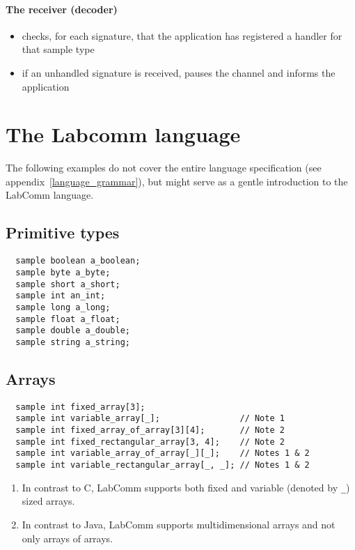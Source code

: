\documentclass[a4paper]{article}
\begin{document}
\paragraph{The receiver (decoder)}

\begin{itemize}
 \item checks, for each signature, that the application has registered a handler for that sample type
 \item if an unhandled signature is received, pauses the channel and informs the application
\end{itemize}

\section{The Labcomm language}

The following examples do not cover the entire language
specification (see appendix~\ref{language_grammar}), but might serve as a
gentle introduction to the LabComm language.

\subsection{Primitive types}

\begin{verbatim}
  sample boolean a_boolean;
  sample byte a_byte;
  sample short a_short;
  sample int an_int;
  sample long a_long;
  sample float a_float;
  sample double a_double;
  sample string a_string;
\end{verbatim}

\subsection{Arrays}

\begin{verbatim}
  sample int fixed_array[3];
  sample int variable_array[_];                // Note 1
  sample int fixed_array_of_array[3][4];       // Note 2
  sample int fixed_rectangular_array[3, 4];    // Note 2
  sample int variable_array_of_array[_][_];    // Notes 1 & 2
  sample int variable_rectangular_array[_, _]; // Notes 1 & 2
\end{verbatim}

\begin{enumerate}
\item In contrast to C, LabComm supports both fixed and variable (denoted
by \verb+_+) sized arrays.

\item In contrast to Java, LabComm supports multidimensional arrays and not
only arrays of arrays.

\end{enumerate}
\end{document}
